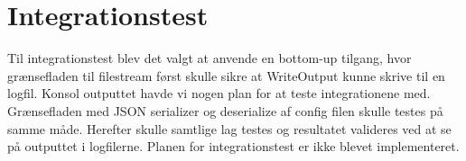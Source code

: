 \section{Integrationstest}
Til integrationstest blev det valgt at anvende en bottom-up tilgang, hvor grænsefladen til filestream først skulle sikre at WriteOutput kunne skrive til en logfil. Konsol outputtet havde vi nogen plan for at teste integrationene med. Grænsefladen med JSON serializer og deserialize af config filen skulle testes på samme måde. Herefter skulle samtlige lag testes og resultatet valideres ved at se på outputtet i logfilerne. Planen for integrationstest er ikke blevet implementeret.


%
